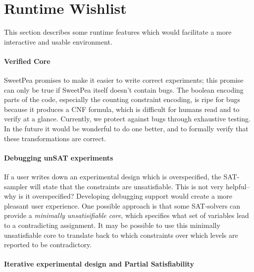 

\section{Runtime Wishlist}

This section describes some runtime features which would facilitate a more interactive and usable environment.


\paragraph*{Verified Core}

SweetPea promises to make it easier to write correct experiments; this promise can only be true if SweetPea itself doesn't contain bugs. The boolean encoding parts of the code, especially the counting constraint encoding, is ripe for bugs because it produces a CNF formula, which is difficult for humans read and to verify at a glance. Currently, we protect against bugs through exhaustive testing. In the future it would be wonderful to do one better, and to formally verify that these transformations are correct.

\paragraph*{Debugging unSAT experiments}

If a user writes down an experimental design which is overspecified, the SAT-sampler will state that the constraints are unsatisfiable. This is not very helpful-- why is it overspecified? Developing debugging support would create a more pleasant user experience. One possible approach is that some SAT-solvers can provide a \emph{minimally unsatisifiable core}, which specifies what set of variables lead to a contradicting assignment. It may be possible to use this minimally unsatisfiable core to translate back to which constraints over which levels are reported to be contradictory.

\paragraph*{Iterative experimental design and Partial Satisfiability}


